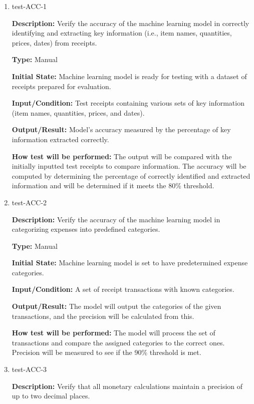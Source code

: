 \documentclass[12pt, titlepage]{article}
\begin{document}
\begin{enumerate}

\item{test-ACC-1\\}

\textbf{Description:} Verify the accuracy of the machine learning model in
correctly identifying and extracting key information (i.e., item names,
quantities, prices, dates) from receipts.

\textbf{Type:} Manual
					
\textbf{Initial State:} Machine learning model is ready for testing with a
dataset of receipts prepared for evaluation.
					
\textbf{Input/Condition:} Test receipts containing various sets of key
information (item names, quantities, prices, and dates).
					
\textbf{Output/Result:} Model's accuracy measured by the percentage of key
information extracted correctly.
					
\textbf{How test will be performed:} The output will be compared with the
initially inputted test receipts to compare information. The accuracy will be
computed by determining the percentage of correctly identified and extracted
information and will be determined if it meets the 80\% threshold.

\item{test-ACC-2\\}

\textbf{Description:} Verify the accuracy of the machine learning model in
categorizing expenses into predefined categories.

\textbf{Type:} Manual
					
\textbf{Initial State:} Machine learning model is set to have predetermined
expense categories.
					
\textbf{Input/Condition:} A set of receipt transactions with known categories.
					
\textbf{Output/Result:} The model will output the categories of the given
transactions, and the precision will be calculated from this.
					
\textbf{How test will be performed:} The model will process the set of
transactions and compare the assigned categories to the correct ones. Precision
will be measured to see if the 90\% threshold is met.

\item{test-ACC-3\\}

\textbf{Description:} Verify that all monetary calculations maintain a
precision of up to two decimal places.


\end{enumerate}
\end{document}
